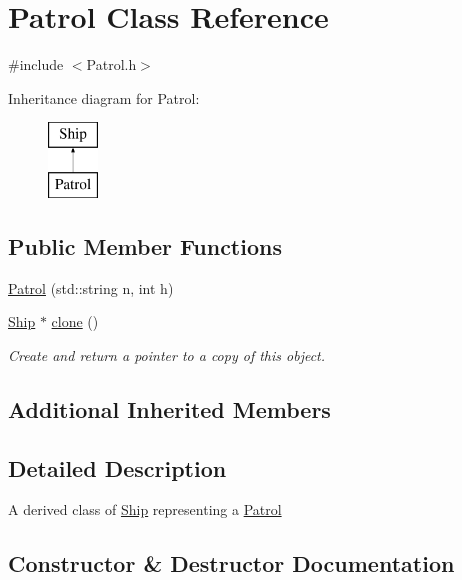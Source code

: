 \hypertarget{class_patrol}{}\section{Patrol Class Reference}
\label{class_patrol}


{\ttfamily \#include $<$Patrol.\+h$>$}

Inheritance diagram for Patrol\+:\begin{figure}[H]
\begin{center}
\leavevmode
\includegraphics[height=2.000000cm]{class_patrol}
\end{center}
\end{figure}
\subsection*{Public Member Functions}
\begin{DoxyCompactItemize}
\item 
\hyperlink{class_patrol_a6c456b4e163008b4a5f15a01c31edb25}{Patrol} (std\+::string n, int h)
\item 
\hypertarget{class_patrol_a1b32a598282697a4d4907976b5f92116}{}\hyperlink{class_ship}{Ship} $\ast$ \hyperlink{class_patrol_a1b32a598282697a4d4907976b5f92116}{clone} ()\label{class_patrol_a1b32a598282697a4d4907976b5f92116}

\begin{DoxyCompactList}\small\item\em Create and return a pointer to a copy of this object. \end{DoxyCompactList}\end{DoxyCompactItemize}
\subsection*{Additional Inherited Members}


\subsection{Detailed Description}
A derived class of \hyperlink{class_ship}{Ship} representing a \hyperlink{class_patrol}{Patrol} 

\subsection{Constructor \& Destructor Documentation}
\hypertarget{class_patrol_a6c456b4e163008b4a5f15a01c31edb25}{}
